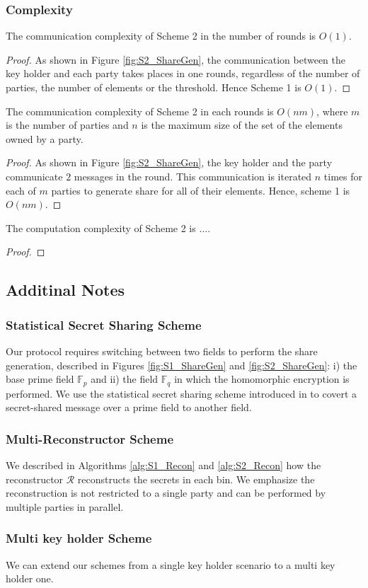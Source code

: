 \subsubsection{Complexity}
\begin{theorem}
The communication complexity of Scheme 2 in the number of rounds is $O(1)$. 
\end{theorem}
\begin{proof}
As shown in Figure \ref{fig:S2_ShareGen}, the communication between the key holder and each party takes places in one rounds, regardless of the number of parties, the number of elements or the threshold. Hence Scheme 1 is $O(1)$. 
\end{proof}
\begin{theorem}
The communication complexity of Scheme 2 in each rounds is $O(nm)$, where $m$ is the number of parties and $n$ is the maximum size of the set of the elements owned by a party. 
\end{theorem}
\begin{proof}
As shown in Figure \ref{fig:S2_ShareGen}, the key holder and the party communicate $2$ messages in the round. This communication is iterated $n$ times for each of $m$ parties to generate share for all of their elements. Hence, scheme 1 is $O(nm)$.  
\end{proof}
\begin{theorem}
The computation complexity of Scheme 2 is $\dots$.
\end{theorem}
\begin{proof}
\end{proof}

\subsection{Additinal Notes}
\subsubsection{Statistical Secret Sharing Scheme}
Our protocol requires switching between two fields to perform the share generation, described in Figures \ref{fig:S1_ShareGen} and \ref{fig:S2_ShareGen}: i) the base prime field $\mathbb{F}_p$ and ii) the field $\mathbb{F}_q$ in which the homomorphic encryption is performed. We use the statistical secret sharing scheme introduced in  \cite{Statistical_SSS} to covert a secret-shared message over a prime field to another field. 
\subsubsection{Multi-Reconstructor Scheme}
We described in Algorithms \ref{alg:S1_Recon} and \ref{alg:S2_Recon} how the reconstructor $\mathcal{R}$ reconstructs the secrets in each bin. We emphasize the reconstruction is not restricted to a single party and can be performed by multiple parties in parallel. 
\subsubsection{Multi key holder Scheme}
We can extend our schemes from a single key holder scenario to a multi key holder one.  